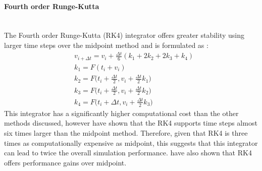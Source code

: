 \paragraph{Fourth order Runge-Kutta}\leavevmode\\
The Fourth order Runge-Kutta (RK4) integrator offers greater stability using larger time steps over the midpoint method and is formulated as \parencite[3]{Wang2009a}:
\begin{equation}
\begin{split}
\label{eq:4th order rk}
  &v_{i + \Delta t} = v_{i} + \frac{\Delta t}{6}(k_{1} + 2k_{2} + 2k_{3} +  k_{4})
  \\&k_{1} = F(t_{i} + v_{i})
  \\&k_{2} = F\bigg(t_{i} + \frac{\Delta t}{2}, v_{i} + \frac{\Delta t}{2}k_{1}\bigg)
  \\&k_{3} = F\bigg(t_{i} + \frac{\Delta t}{2}, v_{i} + \frac{\Delta t}{2}k_{2}\bigg)
  \\&k_{4} = F\bigg(t_{i} + \Delta t, v_{i} + \frac{\Delta t}{2}k_{3}\bigg)
\end{split}
\end{equation}
This integrator has a significantly higher computational cost than the other methods discussed, however \textcite{Volino2001} have shown that the RK4 supports time steps almost six times larger than the midpoint method. Therefore, given that RK4 is three times as computationally expensive as midpoint, this suggests that this integrator can lead to twice the overall simulation performance. \textcite{Wang2009a} have also shown that RK4 offers performance gains over midpoint.

